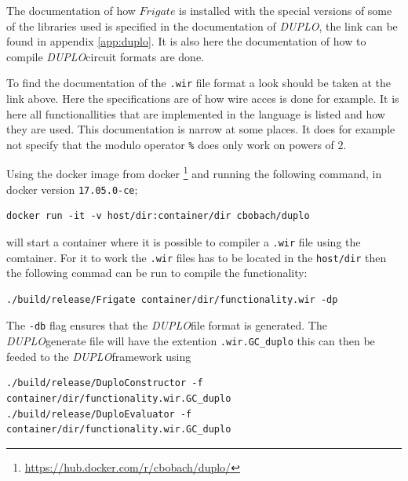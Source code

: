 \documentclass[twoside,11pt,openright]{report}
\newcommand{\DUPLO}{\textit{DUPLO}}
\begin{document}
\begin{appendices}
The documentation of how $Frigate$ is installed with the special versions of some of the libraries used is specified in the documentation of \DUPLO, the link can be found in appendix \ref{app:duplo}. It is also here the documentation of how to compile \DUPLO circuit formats are done.

To find the documentation of the \verb|.wir| file format a look should be taken at the link above. Here the specifications are of how wire acces is done for example. It is here all functionallities that are implemented in the language is listed and how they are used. This documentation is narrow at some places. It does for example not specify that the modulo operator \verb|%| does only work on powers of $2$.

\bigskip

Using the docker image from docker \footnote{\url{https://hub.docker.com/r/cbobach/duplo/}} and running the following command, in docker version \verb|17.05.0-ce|;

\begin{center}
\begin{verbatim}
docker run -it -v host/dir:container/dir cbobach/duplo
\end{verbatim}
\end{center}

will start a container where it is possible to compiler a \verb|.wir| file using the comtainer. For it to work the \verb|.wir| files has to be located in the \verb|host/dir| then the following commad can be run to compile the functionality:

\begin{center}
\begin{verbatim}
./build/release/Frigate container/dir/functionality.wir -dp
\end{verbatim}
\end{center}

The \verb|-db| flag ensures that the \DUPLO file format is generated. The \DUPLO generate file will have the extention \verb|.wir.GC_duplo| this can then be feeded to the \DUPLO framework using

\begin{center}
\begin{verbatim}
./build/release/DuploConstructor -f container/dir/functionality.wir.GC_duplo
./build/release/DuploEvaluator -f container/dir/functionality.wir.GC_duplo
\end{verbatim}
\end{center}


\end{appendices}
\end{document}
